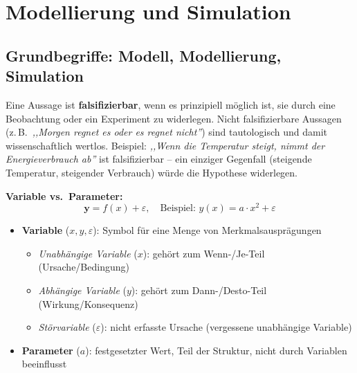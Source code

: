 \section{Modellierung und Simulation}

\subsection{Grundbegriffe: Modell, Modellierung, Simulation}


Eine Aussage ist \textbf{falsifizierbar}, wenn es prinzipiell möglich ist, sie durch eine Beobachtung oder ein Experiment zu widerlegen. Nicht falsifizierbare Aussagen (z.\,B.\ \emph{,,Morgen regnet es oder es regnet nicht''}) sind tautologisch und damit wissenschaftlich wertlos. Beispiel: \emph{,,Wenn die Temperatur steigt, nimmt der Energieverbrauch ab''} ist falsifizierbar -- ein einziger Gegenfall (steigende Temperatur, steigender Verbrauch) würde die Hypothese widerlegen.


\textbf{Variable vs.\ Parameter:}
\[
\boldsymbol{y} = f(x) + \varepsilon, \quad \text{Beispiel: } y(x) = a \cdot x^2 + \varepsilon
\]
\begin{itemize}[leftmargin=1.5em]
    \item \textbf{Variable} ($x, y, \varepsilon$): Symbol für eine Menge von Merkmalsausprägungen
    \begin{itemize}[leftmargin=1.5em]
        \item \textit{Unabhängige Variable} ($x$): gehört zum Wenn-/Je-Teil (Ursache/Bedingung)
        \item \textit{Abhängige Variable} ($y$): gehört zum Dann-/Desto-Teil (Wirkung/Konsequenz)
        \item \textit{Störvariable} ($\varepsilon$): nicht erfasste Ursache (vergessene unabhängige Variable)
    \end{itemize}
    \item \textbf{Parameter} ($a$): festgesetzter Wert, Teil der Struktur, nicht durch Variablen beeinflusst
\end{itemize}


